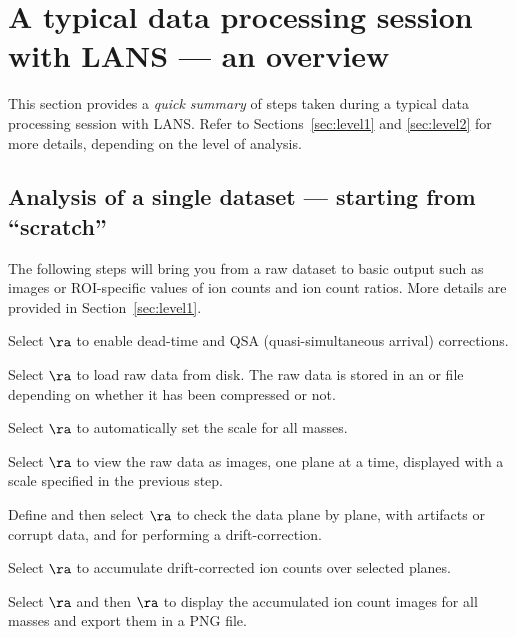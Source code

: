 \section{A typical data processing session with LANS --- an overview}

This section provides a \emph{quick summary} of steps taken during a typical data processing session with LANS. Refer to Sections~\ref{sec:level1} and \ref{sec:level2} for more details, depending on the level of analysis. 


\subsection{Analysis of a single dataset --- starting from ``scratch''}
\label{sec:analysis_from_scratch}
\setcounter{step}{0}

\goldbox{}
The following steps will bring you from a raw dataset to basic output such as images or ROI-specific values of ion counts and ion count ratios. More details are provided in Section~\ref{sec:level1}.
\tcbe

\s Select  $\ra$  to enable dead-time and QSA (quasi-simultaneous arrival) corrections.

\s Select  $\ra$  to load raw data from disk. The raw data is stored in an  or  file depending on whether it has been compressed or not.

\s Select  $\ra$  to automatically set the scale for all masses. 

\s Select  $\ra$  to view the raw data as images, one plane at a time, displayed with a scale specified in the previous step. 

\s Define  and then select  $\ra$  to check the data plane by plane,  with artifacts or corrupt data, and  for performing a drift-correction. 

\s Select  $\ra$  to accumulate drift-corrected ion counts over selected planes.  

\s Select  $\ra$  and then  $\ra$  to display the accumulated ion count images for all masses and export them in a PNG file.

